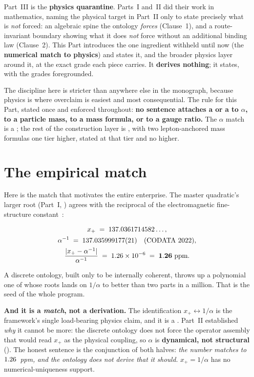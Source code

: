 \noindent Part~III is the \textbf{physics quarantine}. Parts~I and~II did their
work in mathematics, naming the physical target in Part~II only to state precisely
what is \emph{not} forced: an algebraic spine the ontology \emph{forces}
(Clause~1), and a route-invariant boundary showing what it does \emph{not} force
without an additional binding law (Clause~2). This Part introduces the one
ingredient withheld until now (the
\textbf{numerical match to physics}) and states it, and the broader physics
layer around it, at the exact grade each piece carries. It \textbf{derives
nothing}; it states, with the grades foregrounded.

\medskip
\noindent The discipline here is stricter than anywhere else in the monograph,
because physics is where overclaim is easiest and most consequential. The rule for
this Part, stated once and enforced throughout: \textbf{no sentence attaches a
 or a  to $\alpha$, to a particle mass, to a mass formula, or
to a gauge ratio.} The $\alpha$ match is a ; the rest of the
construction layer is , with two lepton-anchored mass formulas one tier
higher, stated at that tier and no higher.

\section{The empirical match}\label{sec:match}
Here is the match that motivates the entire enterprise. The master quadratic's
larger root (Part~I, ) agrees with the reciprocal of the
electromagnetic fine-structure constant~\cite{codata2022}:

\begin{conjecturebox}
\begin{gather*}
  x_+ \;=\; 137.0361714582\ldots, \\
  \alpha^{-1} \;=\; 137.035999177(21) \quad \text{(CODATA 2022)}, \\
  \frac{\lvert x_+ - \alpha^{-1}\rvert}{\alpha^{-1}} \;=\; 1.26\times 10^{-6} \;=\; \mathbf{1.26\ \text{ppm}}.
\end{gather*}
\end{conjecturebox}

\noindent A discrete ontology, built only to be internally coherent, throws up a
polynomial one of whose roots lands on $1/\alpha$ to better than two parts in a
million. That is the seed of the whole program.

\medskip
\noindent\textbf{And it is a \emph{match}, not a derivation.} The
identification $x_+\leftrightarrow1/\alpha$ is the framework's single load-bearing
physics claim, and it is a . Part~II established \emph{why} it cannot be
more: the discrete ontology does not force the operator assembly that would read
$x_+$ as the physical coupling, so $\alpha$ is \textbf{dynamical, not structural}
(). The honest sentence is the conjunction of both halves:
\emph{the number matches to $1.26$~ppm, and the ontology does not derive that
it should.} $x_+ = 1/\alpha$ has no numerical-uniqueness support.

